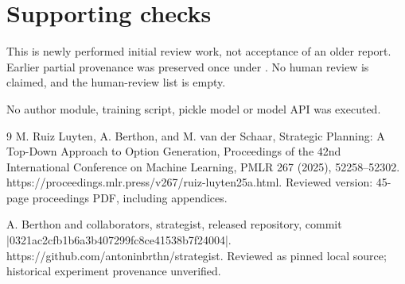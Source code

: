 \documentclass[10pt]{article}
\begin{document}
\section*{Supporting checks}
This is newly performed initial review work, not acceptance of an older report. Earlier partial provenance was preserved once under . No human review is claimed, and the human-review list is empty.\par
No author module, training script, pickle model or model API was executed.\par
9 M. Ruiz Luyten, A. Berthon, and M. van der Schaar, Strategic Planning: A Top-Down Approach to Option Generation, Proceedings of the 42nd International Conference on Machine Learning, PMLR 267 (2025), 52258–52302. https://proceedings.mlr.press/v267/ruiz-luyten25a.html. Reviewed version: 45-page proceedings PDF, including appendices.\par
A. Berthon and collaborators, strategist, released repository, commit |0321ac2cfb1b6a3b407299fc8ce41538b7f24004|. https://github.com/antoninbrthn/strategist. Reviewed as pinned local source; historical experiment provenance unverified.\par
\end{document}
